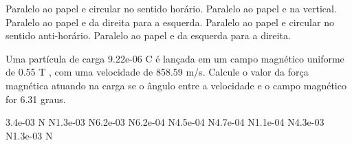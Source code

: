 \documentclass[12pt, addpoints]{exam}
\begin{document}
\begin{questions}
\begin{multicols*}{2}
\begin{choices}
\choice Paralelo ao papel e circular no sentido horário. 
\choice Paralelo ao papel e na vertical. 
\choice Paralelo ao papel e da direita para a esquerda. 
\choice Paralelo ao papel e circular no sentido anti-horário. 
\choice Paralelo ao papel e da esquerda para a direita. 
\end{choices}
\question Uma partícula de carga 9.22e-06 C é lançada em um campo magnético uniforme de    0.55 T , com uma velocidade de 858.59 m/s. Calcule o valor da força magnética atuando na carga se o ângulo entre a velocidade e o campo magnético for    6.31 graus.

\begin{oneparchoices}
\choice 3.4e-03 N N\choice 1.3e-03 N\choice 6.2e-03 N\choice 6.2e-04 N\choice 4.5e-04 N\choice 4.7e-04 N\choice 1.1e-04 N\choice 4.3e-03 N\choice 1.3e-03 N
\end{oneparchoices}\end{multicols*}
\end{questions}
\newpage
\end{document}

